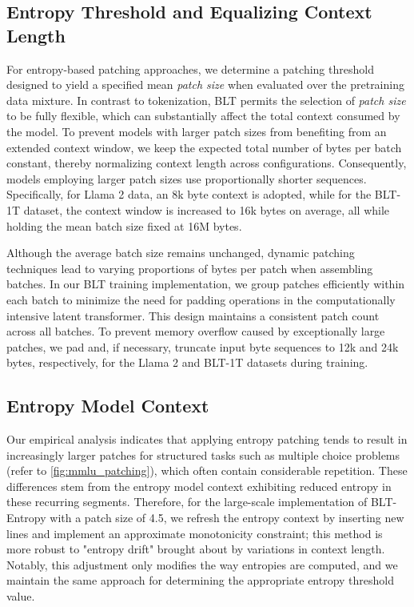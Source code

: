 \subsection{Entropy Threshold and Equalizing Context Length} For entropy-based patching approaches, we determine a patching threshold designed to yield a specified mean \textit{patch size} when evaluated over the pretraining data mixture. In contrast to tokenization, {\textsc BLT} permits the selection of \textit{patch size} to be fully flexible, which can substantially affect the total context consumed by the model. To prevent models with larger patch sizes from benefiting from an extended context window, we keep the expected total number of bytes per batch constant, thereby normalizing context length across configurations. Consequently, models employing larger patch sizes use proportionally shorter sequences. Specifically, for Llama 2 data, an 8k byte context is adopted, while for the {\textsc BLT}-1T dataset, the context window is increased to 16k bytes on average, all while holding the mean batch size fixed at 16M bytes.

Although the average batch size remains unchanged, dynamic patching techniques lead to varying proportions of bytes per patch when assembling batches. In our {\textsc BLT} training implementation, we group patches efficiently within each batch to minimize the need for padding operations in the computationally intensive latent transformer. This design maintains a consistent patch count across all batches. To prevent memory overflow caused by exceptionally large patches, we pad and, if necessary, truncate input byte sequences to 12k and 24k bytes, respectively, for the Llama 2 and {\textsc BLT}-1T datasets during training.

\subsection{Entropy Model Context}
\label{section:entropy-context}
Our empirical analysis indicates that applying entropy patching tends to result in increasingly larger patches for structured tasks such as multiple choice problems (refer to \autoref{fig:mmlu_patching}), which often contain considerable repetition. These differences stem from the entropy model context exhibiting reduced entropy in these recurring segments. Therefore, for the large-scale implementation of {\textsc BLT}-Entropy with a patch size of 4.5, we refresh the entropy context by inserting new lines and implement an approximate monotonicity constraint; this method is more robust to "entropy drift" brought about by variations in context length. Notably, this adjustment only modifies the way entropies are computed, and we maintain the same approach for determining the appropriate entropy threshold value.

